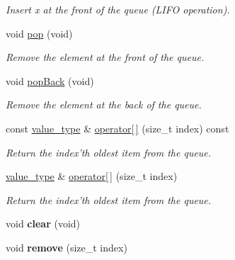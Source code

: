 \begin{DoxyCompactItemize}
\begin{DoxyCompactList}\small\item\em \-Insert x at the front of the queue (\-L\-I\-F\-O operation). \end{DoxyCompactList}\item 
\hypertarget{classxsens_1_1FifoQueueBasic_aa28bb1cebe3f0e01ff1ec5847697dd70}{void \hyperlink{classxsens_1_1FifoQueueBasic_aa28bb1cebe3f0e01ff1ec5847697dd70}{pop} (void)}\label{classxsens_1_1FifoQueueBasic_aa28bb1cebe3f0e01ff1ec5847697dd70}

\begin{DoxyCompactList}\small\item\em \-Remove the element at the front of the queue. \end{DoxyCompactList}\item 
\hypertarget{classxsens_1_1FifoQueueBasic_a3d9e2c4708d577757281e2bdbaec075e}{void \hyperlink{classxsens_1_1FifoQueueBasic_a3d9e2c4708d577757281e2bdbaec075e}{pop\-Back} (void)}\label{classxsens_1_1FifoQueueBasic_a3d9e2c4708d577757281e2bdbaec075e}

\begin{DoxyCompactList}\small\item\em \-Remove the element at the back of the queue. \end{DoxyCompactList}\item 
\hypertarget{classxsens_1_1FifoQueueBasic_a2173da95e88dcbfddf2638052c9dcc44}{const \hyperlink{classxsens_1_1FifoQueueBasic_a4952f1bac21ff075e2b7667cbca0cd0e}{value\-\_\-type} \& \hyperlink{classxsens_1_1FifoQueueBasic_a2173da95e88dcbfddf2638052c9dcc44}{operator\mbox{[}$\,$\mbox{]}} (size\-\_\-t index) const }\label{classxsens_1_1FifoQueueBasic_a2173da95e88dcbfddf2638052c9dcc44}

\begin{DoxyCompactList}\small\item\em \-Return the index'th oldest item from the queue. \end{DoxyCompactList}\item 
\hypertarget{classxsens_1_1FifoQueueBasic_ac0d554117a06054965a173a3c949f895}{\hyperlink{classxsens_1_1FifoQueueBasic_a4952f1bac21ff075e2b7667cbca0cd0e}{value\-\_\-type} \& \hyperlink{classxsens_1_1FifoQueueBasic_ac0d554117a06054965a173a3c949f895}{operator\mbox{[}$\,$\mbox{]}} (size\-\_\-t index)}\label{classxsens_1_1FifoQueueBasic_ac0d554117a06054965a173a3c949f895}

\begin{DoxyCompactList}\small\item\em \-Return the index'th oldest item from the queue. \end{DoxyCompactList}\item 
\hypertarget{classxsens_1_1FifoQueueBasic_a6e9b68332f69675ea4c06c91898b725c}{void {\bfseries clear} (void)}\label{classxsens_1_1FifoQueueBasic_a6e9b68332f69675ea4c06c91898b725c}

\item 
\hypertarget{classxsens_1_1FifoQueueBasic_ab6ad03db2612b04aa7a79a7573516ea2}{void {\bfseries remove} (size\-\_\-t index)}\label{classxsens_1_1FifoQueueBasic_ab6ad03db2612b04aa7a79a7573516ea2}

\end{DoxyCompactItemize}
